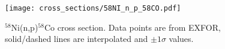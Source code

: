 \begin{figure}[htb]
\texttt{[image: cross\_sections/58NI\_n\_p\_58CO.pdf]}
\caption{$^{58}$Ni(n,p)$^{58}$Co cross section.  Data points are from EXFOR, solid/dashed lines are interpolated and $\pm 1\sigma$ values.}
\label{fig:58NI_n_p_58CO}
\end{figure}

